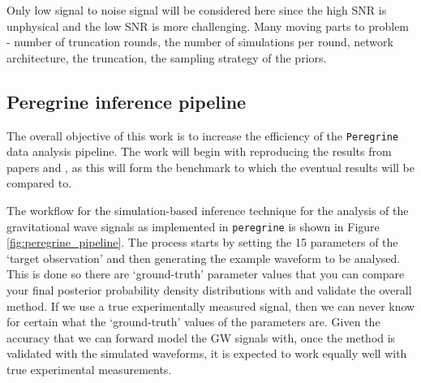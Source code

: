 Only low signal to noise signal will be considered here since the high SNR is unphysical and the low SNR is more challenging. Many moving parts to problem - number of truncation rounds, the number of simulations per round, network architecture, the truncation, the sampling strategy of the priors.

\subsection{Peregrine inference pipeline}

The overall objective of this work is to increase the efficiency of the \texttt{Peregrine} data analysis pipeline. The work will begin with reproducing the results from papers \cite{bhardwaj2023peregrine} and \cite{alvey2023things}, as this will form the benchmark to which the eventual results will be compared to.

The workflow for the simulation-based inference technique for the analysis of the gravitational wave signals as implemented in \texttt{peregrine} \cite{bhardwaj2023peregrine} is shown in Figure \ref{fig:peregrine_pipeline}. The process starts by setting the 15 parameters of the `target observation' and then generating the example waveform to be analysed. This is done so there are `ground-truth' parameter values that you can compare your final posterior probability density distributions with and validate the overall method. If we use a true experimentally measured signal, then we can never know for certain what the `ground-truth' values of the parameters are. Given the accuracy that we can forward model the GW signals with, once the method is validated with the simulated waveforms, it is expected to work equally well with true experimental measurements.


